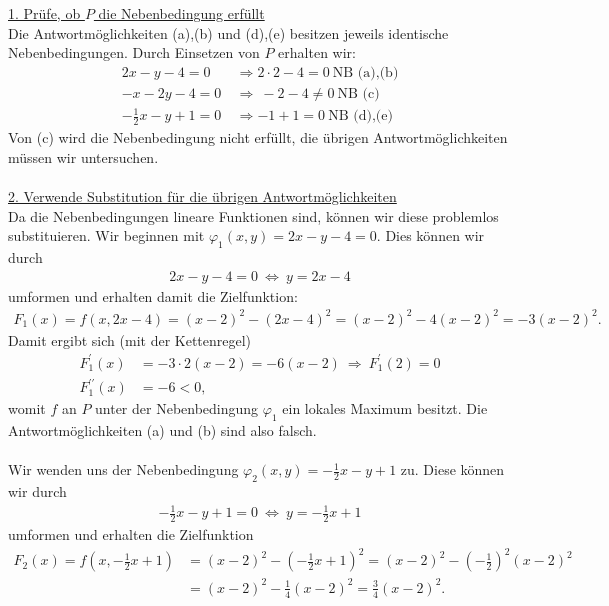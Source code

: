 \underline{1. Prüfe, ob $ P $ die Nebenbedingung erfüllt}\\
Die Antwortmöglichkeiten (a),(b) und (d),(e) besitzen jeweils identische Nebenbedingungen.
Durch Einsetzen von $ P $ erhalten wir:
\begin{align*}
	2 x - y -4 = 0 \ &\Rightarrow 2 \cdot 2 -4  = 0 \ \text{NB (a),(b)}\\
	-x  - 2y - 4 = 0 \ &\Rightarrow \ -2 -4 \neq 0 \ \text{NB (c)}\\
	-\frac{1}{2}x - y + 1 = 0 \ &\Rightarrow -1 + 1 = 0 \ \text{NB (d),(e)}
\end{align*}
Von (c) wird die Nebenbedingung nicht erfüllt, die übrigen Antwortmöglichkeiten müssen wir untersuchen.\\
\\
\underline{2. Verwende Substitution für die übrigen Antwortmöglichkeiten}\\
Da die Nebenbedingungen lineare Funktionen sind, können wir diese problemlos substituieren.
Wir beginnen mit $ \varphi_1(x,y) = 2x-y -4 = 0 $. Dies können wir durch
\begin{align*}
	2x -y -4 = 0 \ \Leftrightarrow \ y = 2x - 4
\end{align*}
umformen und erhalten damit die Zielfunktion:
\begin{align*}
	F_1(x) = f(x, 2x -4) = (x-2)^2 - (2x-4)^2
	= (x-2)^2 - 4 (x-2)^2
	= -3 (x-2)^2.
\end{align*}
Damit ergibt sich (mit der Kettenregel)
\begin{align*}
	F_1^\prime(x) &= -3 \cdot 2 (x -2 ) = -6 (x-2) \ \Rightarrow \ F_1^\prime(2) = 0\\
	F_1^{\prime \prime}(x) &= -6 < 0,
\end{align*}
womit $ f $ an $ P $ unter der Nebenbedingung $ \varphi_1 $ ein lokales Maximum besitzt. Die Antwortmöglichkeiten (a) und (b) sind also falsch.\\
\\
Wir wenden uns der Nebenbedingung $ \varphi_2(x,y) = - \frac{1}{2} x -y +1 $ zu. Diese können wir durch 
\begin{align*}
	- \frac{1}{2} x -y  +1 = 0 
	\ \Leftrightarrow \
	y = - \frac{1}{2}x +1
\end{align*}
umformen und erhalten die Zielfunktion
\begin{align*}
	F_2(x) = f\left(x,-\frac{1}{2} x +1\right)
	&=
	(x-2)^2 - \left(-\frac{1}{2} x +1\right)^2
	=
	(x-2)^2- \left(-\frac{1}{2}\right)^2 (x - 2)^2\\
	&=
	(x-2)^2 - \frac{1}{4}(x - 2)^2
	= \frac{3}{4} (x-2)^2.
\end{align*}
